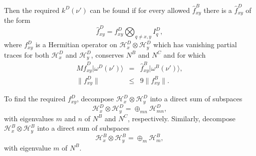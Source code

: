 \documentclass[twocolumn,amsmath,amssymb]{revtex4-1}
\begin{document}
Then the required $k^D( \nu')$ can be found
if for every allowed $\hat{ f}^B_{xy}$ there is a
$\hat{ f}^D_{xy}$ of the form
\begin{equation}
\label{defhf4}
\hat{ f}^D_{xy} =  f^D_{xy} \bigotimes_{q \ne x,y} I^D_q, 
\end{equation}
where $f^D_{xy}$ is a Hermitian operator on
$\mathcal{H}^D_x \otimes \mathcal{H}^D_y$
which has vanishing partial traces
for both $\mathcal{H}^D_x$ and $\mathcal{H}^D_y$,
conserves $N^B$ and $N^C$ and
for which
\begin{subequations}
  \begin{eqnarray}
  \label{omegaw1}
  M \hat{ f}^D_{xy}|\omega^D(\nu') \rangle  &=& \hat{ f}^B_{xy}|\omega^B(\nu') \rangle , \\
  \label{normkw1}
  \parallel f^D_{xy} \parallel &\le& 9 \parallel f^B_{xy} \parallel.
  \end{eqnarray}
  \end{subequations}

To find the required $f^D_{xy}$, decompose $\mathcal{H}^D_x \otimes \mathcal{H}^D_y$
into a direct sum of subspaces
\begin{equation}
  \label{directsumd}
  \mathcal{H}^D_x \otimes \mathcal{H}^D_y = \oplus_{mn} \mathcal{H}^D_{mn},
\end{equation}
with eigenvalues $m$ and $n$ of $N^B$ and $N^C$, respectively.
Similarly, decompose $\mathcal{H}^B_x \otimes \mathcal{H}^B_y$
into a direct sum of subspaces
\begin{equation}
  \label{directsumd1}
  \mathcal{H}^B_x \otimes \mathcal{H}^B_y = \oplus_m \mathcal{H}^B_m,
\end{equation}
with eigenvalue $m$ of $N^B$.
\end{document}
